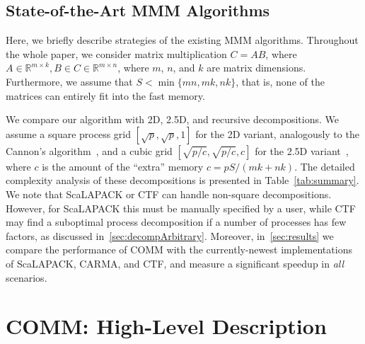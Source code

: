 \documentclass[sigplan,review,anonymous,10pt]{acmart}\settopmatter{printfolios=true,printccs=false,printacmref=false}
\newcommand\greg[1]{\textcolor{blue}{[Greg: #1]}}
\newcommand\mac[1]{\textcolor{red}{[Mac: #1]}}
\begin{document}


\subsection{State-of-the-Art MMM Algorithms}

Here, we briefly describe strategies of the existing MMM algorithms.
 Throughout the whole paper, we consider matrix multiplication $C = 
AB$, where $A \in \mathbb{R}^{m \times k}, B \in  C \in \mathbb{R}^{m \times 
	n}$, where $m$, $n$, and $k$ are matrix dimensions. Furthermore, we assume 
	that $S < \min\{mn, mk, nk\}$, that is, none of the matrices can entirely 
	fit into the fast memory. 
	
	We compare our algorithm with 2D, 2.5D, and recursive 
	decompositions. We assume a square process grid $[\sqrt{p}, \sqrt{p}, 1]$ 
	for the 2D variant, analogously 
	to the Cannon's algorithm~\cite{Cannon}, and a cubic grid $[\sqrt{p/c}, 
	\sqrt{p/c}, c]$ for the 2.5D 
	variant~\cite{25d}, where $c$ is the amount of the ``extra'' memory $c = 
	pS/(mk 
	+ nk)$. 	The detailed complexity analysis of these decompositions is 
	presented in 
	Table~\ref{tab:summary}.
	We note that ScaLAPACK or CTF can handle non-square 
	decompositions. However, for ScaLAPACK this must be manually specified by a 
	user, while CTF may find a suboptimal process decomposition if a number of 
	processes has few factors, as discussed in~\cref{sec:decompArbitrary}. 
	Moreover, 
	in~\cref{sec:results} we compare the 
	performance of COMM with the currently-newest implementations of ScaLAPACK, 
	CARMA,  
	and CTF, and measure a significant speedup in \emph{all} scenarios. 

\section{COMM: High-Level Description}
%
\end{document}
